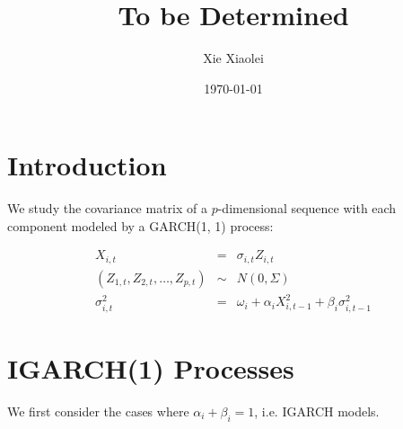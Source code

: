 \documentclass{article}
\title{To be Determined}
\author{Xie Xiaolei}
\date{\today}
\begin{document}
\maketitle

\section{Introduction}
We study the covariance matrix of a $p$-dimensional sequence with each
component modeled by a GARCH(1, 1) process:

\begin{eqnarray*}
  X_{i,t} &=& \sigma_{i,t} Z_{i,t} \\
  (Z_{1, t}, Z_{2,t}, \dots, Z_{p,t}) &\sim& N(0, \Sigma) \\
  \sigma_{i, t}^2 &=& \omega_i + \alpha_i X_{i, t-1}^2 + \beta_i
  \sigma_{i, t-1}^2
\end{eqnarray*}

\section{IGARCH(1) Processes}
We first consider the cases where $\alpha_i + \beta_i = 1$,
i.e. IGARCH models.
\end{document}
